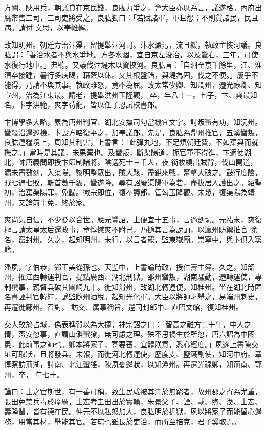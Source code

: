 \begin{pinyinscope}
 方關、陜用兵，朝議貸在京民錢，良肱力爭之，會大臣亦以為言，議遂格。內府出腐幣售三司，三司吏將受之，良肱獨曰：「若賦諸軍，軍且怨；不則貨諸民，民且病。請付
 文思，以奉帷幄。



 改知明州。朝廷方治汴渠，留提舉汴河司。汴水澱污，流且緩，執政主挾河議。良肱謂：「善治水者不與水爭地。方冬水涸，宜自京左浚治，以及畿右，三年，可使水復行地中。」弗聽。又議伐汴堤木以資挾河。良肱言：「自泗至京千餘里，江、淮漕卒接踵，暑行多病暍，藉蔭以休。又其根盤錯，與堤為固，伐之不便。」屢爭不能得，乃請不與其事。執政雖怒，竟不為屈。改太常少卿、知潤州，遷光祿卿、知宣州，治為江東最。請老，提舉洪州玉隆觀，
 卒，年八十一。七子，卞、爽最知名。卞字洪範，爽字荀龍，皆以任子恩試校書郎。



 卞博學多大略，累為唐州判官、湖北安撫司勾當機宜文字。討叛蠻有功，知沅州。蠻殺沿邊巡檢，卞設方略復平之，加奉議郎。先是，良肱為鼎州推官，五溪蠻叛，良肱運糧境上，周知其利害，上書言：「此彈丸地，不足煩朝廷費，不如棄與而就撫之。」當時是其議，未果棄也。及蠻叛，斷渠陽道，扼官軍不得進，卞適使湖北，帥唐義問即授卞節制諸將。陰選死士三千人，夜
 銜枚繞出賊背，伐山開道，漏未盡數刻，入渠陽。黎明整眾出，賊大駭，盡銳來戰，奮擊大破之。鼓行度險，賊七遇七敗，斬首數千級，蠻遂降。尋有詔廢渠陽軍為砦，盡拔居人護出之。紹聖初，治棄渠陽罪，免歸。徽宗即位，復奉議郎，管勾玉隆觀。未幾，復渠陽為靖州，又論前事免，終於家。



 爽尚氣自信，不少貶以合世。應元豐詔，上便宜十五事，言過剴切。元祐末，爽復極言請太皇太后還政事，章惇憾爽不附己，乃擿其言為謗訕，以瀛州防禦推官
 除名，竄封州。久之，起知明州，未行，以言者罷，監東嶽廟。崇寧中，與卞俱入黨籍。



 潘夙，字伯恭，鄭王美從孫也。天聖中，上書論時政，授仁壽主簿。久之，知韶州，擢江西轉運判官，提點廣西、湖北刑獄。邵州蠻叛，湖南騷動，遷轉運使，專制蠻事，親督兵破其團峒九十。徙知滑州，改湖北轉運便，知桂州。坐在湖北時匿名書誣判官韓繹，謫監隨州酒稅。起知光化軍。大臣以將帥才舉之，易端州刺史，再遷徙鄜州。召對，
 訪交、廣事稱旨，還司封郎中、直昭文館，復知桂州。



 交人敗於占城，偽表稱賀以為大捷，神宗詔之曰：「智高之難方二十年，中人之情，燕安忽事，直謂山僻蠻獠，無可慮之理。殊不思禍生於所忽，唐六詔為中國患，此前事之師也。卿本將家子，寄要蕃，宜體朕意，悉心經度。」夙遂上書陳交址可取狀，且將發兵。未報，而徙河北轉運使，歷度支、鹽鐵副使，知河中府。章惇察訪荊湖，討南、北江蠻猺，陳夙憂邊狀，以知潭州。再遷光祿卿，知荊南、鄂州，卒，
 年七十。



 論曰：士之官斯世，有一善可稱，致生民咸被其澤於無窮者，故州郡之寄為尤重，張田免禁兵毒於瘴厲，士宏考圭田出於實輸，朱景父子、諲、載、煦、渙、士宏、壽隆輩，皆有德在民。仲元不以私怒加人，良肱明於折獄，夙以將家子而能留心邊務，用當其材，舉能其官。若琮也雖長於吏治，而所至掊克，君子奚取焉。



\end{pinyinscope}